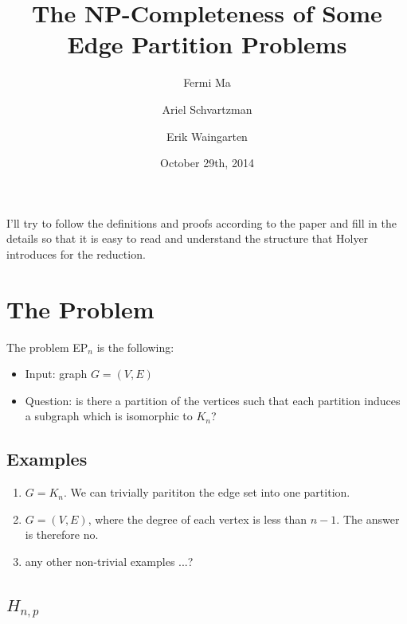 \documentclass[runningheads,a4paper]{llncs}
\date{October 29th, 2014}							%
\begin{document}
\title{The NP-Completeness of Some Edge Partition Problems}
\titlerunning{}

\author{Fermi Ma \and Ariel Schvartzman \and Erik Waingarten}
%


\maketitle

I'll try to follow the definitions and proofs according to the paper \cite{holyer1981np} and fill in the details so that it is easy to read and understand the structure that Holyer introduces for the reduction. 

\section{The Problem}

The problem EP$_n$ is the following: 
\begin{itemize}
\item Input: graph $G = (V, E)$
\item Question: is there a partition of the vertices such that each partition induces a subgraph which is isomorphic to $K_n$?
\end{itemize}

\subsection{Examples}

\begin{enumerate}
\item $G = K_n$. We can trivially parititon the edge set into one partition.
\item $G = (V, E)$, where the degree of each vertex is less than $n-1$. The answer is therefore no.
\item any other non-trivial examples ...?
\end{enumerate}

\subsection{$H_{n,p}$}
\end{document}
